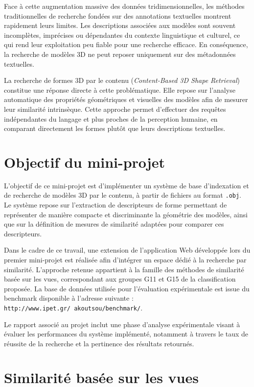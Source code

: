 \documentclass[11pt,a4paper,oneside]{report}
\begin{document}
Face à cette augmentation massive des données tridimensionnelles, les méthodes traditionnelles de recherche fondées sur des annotations textuelles montrent rapidement leurs limites. Les descriptions associées aux modèles sont souvent incomplètes, imprécises ou dépendantes du contexte linguistique et culturel, ce qui rend leur exploitation peu fiable pour une recherche efficace. En conséquence, la recherche de modèles 3D ne peut reposer uniquement sur des métadonnées textuelles.

La recherche de formes 3D par le contenu (\textit{Content-Based 3D Shape Retrieval}) constitue une réponse directe à cette problématique. Elle repose sur l’analyse automatique des propriétés géométriques et visuelles des modèles afin de mesurer leur similarité intrinsèque. Cette approche permet d’effectuer des requêtes indépendantes du langage et plus proches de la perception humaine, en comparant directement les formes plutôt que leurs descriptions textuelles.

\section{Objectif du mini-projet}

L’objectif de ce mini-projet est d’implémenter un système de base d’indexation et de recherche de modèles 3D par le contenu, à partir de fichiers au format \texttt{.obj}. Le système repose sur l’extraction de descripteurs de forme permettant de représenter de manière compacte et discriminante la géométrie des modèles, ainsi que sur la définition de mesures de similarité adaptées pour comparer ces descripteurs.

Dans le cadre de ce travail, une extension de l’application Web développée lors du premier mini-projet est réalisée afin d’intégrer un espace dédié à la recherche par similarité. L’approche retenue appartient à la famille des méthodes de similarité basée sur les vues, correspondant aux groupes G11 et G15 de la classification proposée. La base de données utilisée pour l’évaluation expérimentale est issue du benchmark disponible à l’adresse suivante : \texttt{http://www.ipet.gr/~akoutsou/benchmark/}.

Le rapport associé au projet inclut une phase d’analyse expérimentale visant à évaluer les performances du système implémenté, notamment à travers le taux de réussite de la recherche et la pertinence des résultats retournés.

\section{Similarité basée sur les vues}
\end{document}
